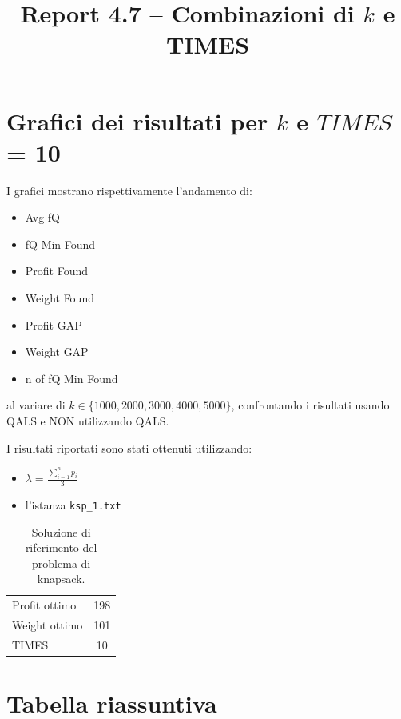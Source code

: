 \documentclass[a4paper,12pt]{article}
\title{Report 4.7 -- Combinazioni di $k$ e TIMES}
\begin{document}
\maketitle

\newpage

\section{Grafici dei risultati per $k$ e $TIMES$ = 10}

I grafici mostrano rispettivamente l'andamento di:
\begin{itemize}
    \item Avg fQ
    \item fQ Min Found
    \item Profit Found
    \item Weight Found
    \item Profit GAP
    \item Weight GAP
    \item n of fQ Min Found
\end{itemize}
al variare di $k \in \{1000, 2000, 3000, 4000, 5000\}$, confrontando
i risultati usando QALS e NON utilizzando QALS.

I risultati riportati sono stati ottenuti utilizzando:

\begin{itemize}
    \item $\lambda = \frac{\sum_{i=1}^{n} p_i}{3}$
    \item l'istanza \texttt{ksp\_1.txt}
\end{itemize}

\begin{table}[H]
\centering
\begin{tabular}{lc}
\toprule
Profit ottimo & 198 \\
Weight ottimo & 101 \\
TIMES & 10 \\
\bottomrule
\end{tabular}
\caption{Soluzione di riferimento del problema di knapsack.}
\end{table}

\section{Tabella riassuntiva}
\end{document}
